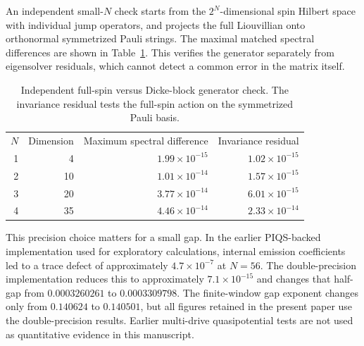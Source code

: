 \documentclass[aps,pra,10pt,onecolumn,superscriptaddress,amsmath,amssymb]{revtex4-2}
\begin{document}
An independent small-$N$ check starts from the $2^N$-dimensional spin Hilbert space with individual jump operators, and projects the full Liouvillian onto orthonormal symmetrized Pauli strings. The maximal matched spectral differences are shown in Table~\ref{tab:small}. This verifies the generator separately from eigensolver residuals, which cannot detect a common error in the matrix itself.

\begin{table}[h]
\caption{Independent full-spin versus Dicke-block generator check. The invariance residual tests the full-spin action on the symmetrized Pauli basis.}
\label{tab:small}
\begin{ruledtabular}
\begin{tabular}{rrrr}
$N$&Dimension&Maximum spectral difference&Invariance residual\\
1&4&$1.99\times10^{-15}$&$1.02\times10^{-15}$\\
2&10&$1.01\times10^{-14}$&$1.57\times10^{-15}$\\
3&20&$3.77\times10^{-14}$&$6.01\times10^{-15}$\\
4&35&$4.46\times10^{-14}$&$2.33\times10^{-14}$
\end{tabular}
\end{ruledtabular}
\end{table}

This precision choice matters for a small gap. In the earlier PIQS-backed implementation used for exploratory calculations, internal emission coefficients led to a trace defect of approximately $4.7\times10^{-7}$ at $N=56$. The double-precision implementation reduces this to approximately $7.1\times10^{-15}$ and changes that half-gap from $0.0003260261$ to $0.0003309798$. The finite-window gap exponent changes only from $0.140624$ to $0.140501$, but all figures retained in the present paper use the double-precision results. Earlier multi-drive quasipotential tests are not used as quantitative evidence in this manuscript.
\end{document}
